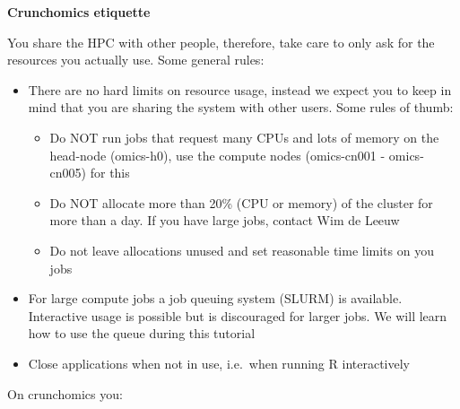 \documentclass[
  letterpaper,
  DIV=11,
  numbers=noendperiod]{scrreprt}
\providecommand{\tightlist}{%
  \setlength{\itemsep}{0pt}\setlength{\parskip}{0pt}}\usepackage{longtable,booktabs,array}
\begin{document}
\begin{tcolorbox}[enhanced jigsaw, toprule=.15mm, rightrule=.15mm, leftrule=.75mm, opacitybacktitle=0.6, colframe=quarto-callout-important-color-frame, colbacktitle=quarto-callout-important-color!10!white, breakable, title=\textcolor{quarto-callout-important-color}{\faExclamation}\hspace{0.5em}{Important}, bottomrule=.15mm, toptitle=1mm, titlerule=0mm, opacityback=0, bottomtitle=1mm, arc=.35mm, left=2mm, colback=white, coltitle=black]

\textbf{Crunchomics etiquette}

You share the HPC with other people, therefore, take care to only ask
for the resources you actually use. Some general rules:

\begin{itemize}
\tightlist
\item
  There are no hard limits on resource usage, instead we expect you to
  keep in mind that you are sharing the system with other users. Some
  rules of thumb:

  \begin{itemize}
  \tightlist
  \item
    Do NOT run jobs that request many CPUs and lots of memory on the
    head-node (omics-h0), use the compute nodes (omics-cn001 -
    omics-cn005) for this
  \item
    Do NOT allocate more than 20\% (CPU or memory) of the cluster for
    more than a day. If you have large jobs, contact Wim de Leeuw
  \item
    Do not leave allocations unused and set reasonable time limits on
    you jobs
  \end{itemize}
\item
  For large compute jobs a job queuing system (SLURM) is available.
  Interactive usage is possible but is discouraged for larger jobs. We
  will learn how to use the queue during this tutorial
\item
  Close applications when not in use, i.e.~when running R interactively
\end{itemize}

\end{tcolorbox}

On crunchomics you:
\end{document}
